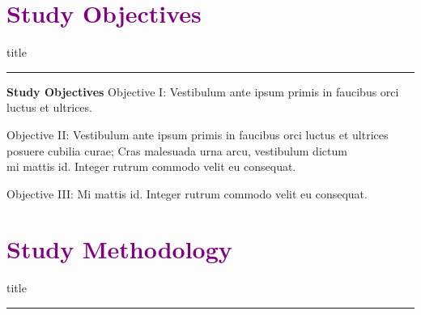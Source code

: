 \documentclass[aspectratio=169]{beamer}
\begin{document}
\section{\textbf{\textcolor{purple}{Study Objectives}}}
    \begin{frame}[plain]
        \vfill
      \centering
      \begin{beamercolorbox}[sep=8pt,center,shadow=true,rounded=true]{title}
        \insertsectionhead\par%
        \color{oxfordblue}\noindent\rule{10cm}{1pt}
      \end{beamercolorbox}
      \vfill
  \end{frame}

\begin{frame}{\textcolor{cmindsblue}{\textbf{Study Objectives}}}
    \textcolor{cmindsblue}{Objective I}: Vestibulum ante ipsum primis in faucibus orci luctus et ultrices.\\

    \vspace{2mm}
    
    \textcolor{cmindsblue}{Objective II}: Vestibulum ante ipsum primis in faucibus orci luctus et ultrices\\  \hspace{2.3cm} posuere cubilia curae; Cras malesuada urna arcu, vestibulum dictum\\  \hspace{2.3cm} mi mattis id. Integer rutrum commodo velit eu consequat. \\

    \vspace{2mm}
    
    \textcolor{cmindsblue}{Objective III}: Mi mattis id. Integer rutrum commodo velit eu consequat.
    
\end{frame}

\section{\textbf{\textcolor{purple}{Study Methodology}}}
    \begin{frame}[plain]
        \vfill
      \centering
      \begin{beamercolorbox}[sep=8pt,center,shadow=true,rounded=true]{title}
        \insertsectionhead\par%
        \color{oxfordblue}\noindent\rule{10cm}{1pt}
      \end{beamercolorbox}
      \vfill
  \end{frame}
\end{document}
